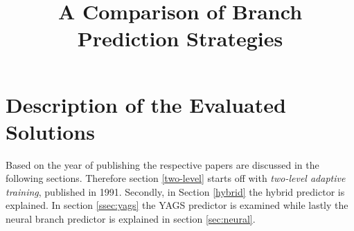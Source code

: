 \documentclass[conference]{IEEEtran}
\begin{document}
%
\title{A Comparison of Branch Prediction Strategies}


\author{
}


\maketitle



\IEEEpeerreviewmaketitle




\section{Description of the Evaluated Solutions}
Based on the year of publishing the respective papers are discussed in the following sections.
Therefore section \ref{two-level} starts off with \textit{two-level adaptive training}, published in 1991.
Secondly, in Section \ref{hybrid} the hybrid predictor is explained. In section \ref{ssec:yags} the YAGS predictor is examined while lastly the neural branch predictor is explained in section \ref{sec:neural}.
\end{document}
